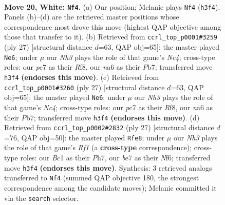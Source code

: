 \documentclass[11pt]{article}
\begin{document}
\begin{figure}[p]\centering
\begin{subfigure}{0.46\textwidth}\centering
\resizebox{\linewidth}{!}{%
\newchessgame
\chessboard[
  setfen={r2q1rk1/ppp1b3/n4pp1/5b1p/P1pP4/2N4N/RPP1RPPP/2BQ2K1 w - - 2 20},
  showmover=false,
  pgfstyle=straightmove, color=movearrow, markmove={h3-f4}
]}
\caption{}
\end{subfigure}\hfill
\begin{subfigure}{0.46\textwidth}\centering
\resizebox{\linewidth}{!}{%
\newchessgame
\chessboard[
  setfen={r4rk1/1ppqnppp/p7/2npPb2/8/N1P1B3/PPB2PPP/R2Q1RK1 b - - 6 14},
  showmover=false,
  pgfstyle=straightmove, color=movearrow, markmove={c5-e6}
]}
\caption{}
\end{subfigure}
\\[4pt]
\begin{subfigure}{0.46\textwidth}\centering
\resizebox{\linewidth}{!}{%
\newchessgame
\chessboard[
  setfen={r4rk1/1ppqnppp/p7/2npPb2/8/N1P1B3/PPB2PPP/R2Q1RK1 b - - 6 14},
  showmover=false,
  pgfstyle=straightmove, color=movearrow, markmove={c5-e6}
]}
\caption{}
\end{subfigure}\hfill
\begin{subfigure}{0.46\textwidth}\centering
\resizebox{\linewidth}{!}{%
\newchessgame
\chessboard[
  setfen={r4rk1/pp1q1ppp/2n2n2/2Bp4/6b1/5NP1/PP2PPBP/2RQ1RK1 b - - 0 14},
  showmover=false,
  pgfstyle=straightmove, color=movearrow, markmove={f8-e8}
]}
\caption{}
\end{subfigure}
\caption{\textbf{Move 20, White: \texttt{Nf4}.} (a) Our position; Melanie plays \texttt{Nf4} (\texttt{h3f4}). Panels (b)--(d) are the retrieved master positions whose correspondence most drove this move (highest QAP objective among those that transfer to it). (b) Retrieved from \texttt{ccrl\_top\_p0001\#3259} (ply 27) [structural distance $d$=63, QAP obj=65]: the master played \texttt{Ne6}; under $\mu$ our \emph{Nh3} plays the role of that game's \emph{Nc4}; cross-type roles: our \emph{p}c7 as their \emph{R}f8, our \emph{n}a6 as their \emph{P}b7; transferred move \texttt{h3f4} \textbf{(endorses this move)}. (c) Retrieved from \texttt{ccrl\_top\_p0001\#3260} (ply 27) [structural distance $d$=63, QAP obj=65]: the master played \texttt{Ne6}; under $\mu$ our \emph{Nh3} plays the role of that game's \emph{Nc4}; cross-type roles: our \emph{p}c7 as their \emph{R}f8, our \emph{n}a6 as their \emph{P}b7; transferred move \texttt{h3f4} \textbf{(endorses this move)}. (d) Retrieved from \texttt{ccrl\_top\_p0002\#2832} (ply 27) [structural distance $d$=76, QAP obj=50]: the master played \texttt{Rfe8}; under $\mu$ our \emph{Nh3} plays the role of that game's \emph{Rf1} (a \textbf{cross-type} correspondence); cross-type roles: our \emph{B}c1 as their \emph{P}h7, our \emph{b}e7 as their \emph{N}f6; transferred move \texttt{h3f4} \textbf{(endorses this move)}. Synthesis: 3 retrieved analogs transferred to \texttt{Nf4} (summed QAP objective 180, the strongest correspondence among the candidate moves); Melanie committed it via the \texttt{search} selector.}
\label{fig:thought-m38}
\end{figure}
\end{document}
